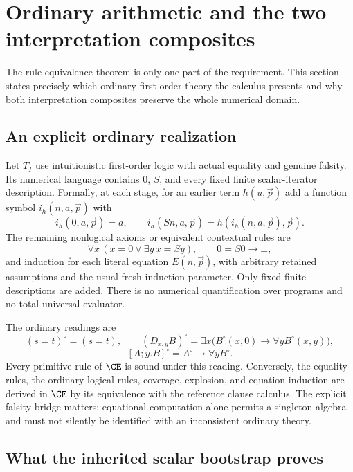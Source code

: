 \section{Ordinary arithmetic and the two interpretation composites}
\label{sec:main-ordinary}

The rule-equivalence theorem is only one part of the requirement. This
section states precisely which ordinary first-order theory the calculus
presents and why both interpretation composites preserve the whole
numerical domain.

\subsection{An explicit ordinary realization}

Let $T_I$ use intuitionistic first-order logic with actual equality and
genuine falsity. Its numerical language contains $0$, $S$, and every fixed
finite scalar-iterator description. Formally, at each stage, for an
earlier term $h(u,\vec p)$ add a function symbol $i_h(n,a,\vec p)$ with
\[
 i_h(0,a,\vec p)=a,\qquad
 i_h(Sn,a,\vec p)=h(i_h(n,a,\vec p),\vec p).
\]
The remaining nonlogical axioms or equivalent contextual rules are
\[
 \forall x\,(x=0\lor\exists y\,x=Sy),\qquad
 0=S0\longrightarrow\bot,
\]
and induction for each literal equation $E(n,\vec p)$, with arbitrary
retained assumptions and the usual fresh induction parameter.
Only fixed finite descriptions are added. There is no numerical
quantification over programs and no total universal evaluator.

The ordinary readings are
\[
 (s=t)^\circ=(s=t),\qquad
 (D_{x,y}B)^\circ=\exists x\bigl(B^\circ(x,0)\to
                                      \forall y B^\circ(x,y)\bigr),
\]
\[
 [A;y.B]^\circ=A^\circ\to\forall y B^\circ.
\]
Every primitive rule of $\CE$ is sound under this reading. Conversely,
the equality rules, the ordinary logical rules, coverage, explosion,
and equation induction are derived in $\CE$ by its equivalence with
the reference clause calculus. The explicit falsity bridge matters:
equational computation alone permits a singleton algebra and must not
silently be identified with an inconsistent ordinary theory.

\subsection{What the inherited scalar bootstrap proves}

